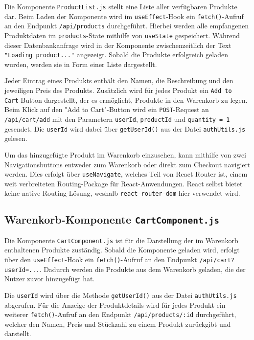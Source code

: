 \documentclass[oneside]{ausarbeitung}
\begin{document}
Die Komponente \texttt{ProductList.js} stellt eine Liste aller verfügbaren Produkte dar. Beim Laden der Komponente wird im \texttt{useEffect}-Hook ein \texttt{fetch()}-Aufruf an den Endpunkt \texttt{/api/products} durchgeführt. Hierbei werden alle empfangenen Produktdaten im \texttt{products}-State mithilfe von \texttt{useState} gespeichert. Während dieser Datenbankanfrage wird in der Komponente zwischenzeitlich der Text \texttt{"Loading product..."} angezeigt. Sobald die Produkte erfolgreich geladen wurden, werden sie in Form einer Liste dargestellt.

Jeder Eintrag eines Produkts enthält den Namen, die Beschreibung und den jeweiligen Preis des Produkts. Zusätzlich wird für jedes Produkt ein \texttt{Add to Cart}-Button dargestellt, der es ermöglicht, Produkte in den Warenkorb zu legen. Beim Klick auf den "Add to Cart"-Button wird ein \texttt{POST}-Request an \texttt{/api/cart/add} mit den Parametern \texttt{userId}, \texttt{productId} und \texttt{quantity = 1} gesendet. Die \texttt{userId} wird dabei über \texttt{getUserId()} aus der Datei \texttt{authUtils.js} gelesen.

Um das hinzugefügte Produkt im Warenkorb einzusehen, kann mithilfe von zwei Navigationsbuttons entweder zum Warenkorb oder direkt zum Checkout navigiert werden. Dies erfolgt über \texttt{useNavigate}, welches Teil von React Router ist, einem weit verbreiteten Routing-Package für React-Anwendungen. React selbst bietet keine native Routing-Lösung, weshalb \texttt{react-router-dom} hier verwendet wird.

\subsection{Warenkorb-Komponente \texttt{CartComponent.js}} 

Die Komponente \texttt{CartComponent.js} ist für die Darstellung der im Warenkorb enthaltenen Produkte zuständig. Sobald die Komponente geladen wird, erfolgt über den \texttt{useEffect}-Hook ein \texttt{fetch()}-Aufruf an den Endpunkt \texttt{/api/cart?userId=...}. Dadurch werden die Produkte aus dem Warenkorb geladen, die der Nutzer zuvor hinzugefügt hat.

Die \texttt{userId} wird über die Methode \texttt{getUserId()} aus der Datei \texttt{authUtils.js} abgerufen. Für die Anzeige der Produktdetails wird für jedes Produkt ein weiterer \texttt{fetch()}-Aufruf an den Endpunkt \texttt{/api/products/:id} durchgeführt, welcher den Namen, Preis und Stückzahl zu einem Produkt zurückgibt und darstellt.
\end{document}
